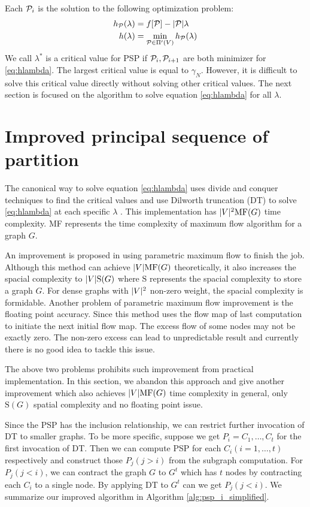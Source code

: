 \documentclass[runningheads]{llncs}
\begin{document}
Each $\P_i$ is the solution to the following optimization problem:
\begin{align}
h_{\P}(\lambda) &=  f[\P] - \abs{\P} \lambda  \label{eq:hPL}\\
h(\lambda) &= \min_{\P \in \Pi'(V)} h_{\P}(\lambda) \label{eq:hlambda}
\end{align}
We call $\lambda^*$ is a critical value for PSP if $\P_i, \P_{i+1}$ are both minimizer for \eqref{eq:hlambda}.
The largest critical value is equal to $\gamma_N$. However, it is difficult to solve this critical value directly without solving other critical values. The next section is focused on the algorithm to solve equation \eqref{eq:hlambda} for all $\lambda$.
\section{Improved principal sequence of partition}
The canonical way to solve equation \eqref{eq:hlambda} uses divide and conquer techniques to find the critical values and use Dilworth truncation (DT) to solve \eqref{eq:hlambda} at each specific $\lambda$ \cite{RN7}.  This implementation has $\abs{V}^2 \textrm{MF}(G)$ time complexity. \textrm{MF} represents the time complexity of maximum flow algorithm for a graph $G$. 

An improvement is proposed in \cite{RN4} using parametric maximum flow to finish the job. Although this method can achieve $\abs{V} \textrm{MF}(G)$ theoretically, it also increases the spacial complexity to $ \abs{V} \textrm{S}(G)$ where $\textrm{S}$ represents the spacial complexity to store a graph $G$. For dense graphs with $\abs{V}^2$ non-zero weight, the spacial complexity is formidable. 
Another problem of parametric maximum flow improvement is the floating point accuracy. Since this method uses the flow map of last computation to initiate the next initial flow map. The excess flow of some nodes may not be exactly zero. The non-zero excess can lead to unpredictable result and currently there is no good idea to tackle this issue. 

The above two problems prohibits such improvement from practical implementation. In this section, we abandon this approach and give another improvement which also achieves $\abs{V} \textrm{MF}(G)$ time complexity in general, only $\textrm{S}(G)$ spatial complexity and no floating point issue.

Since the PSP has the inclusion relationship, we can restrict further invocation of DT to smaller graphs. To be more specific, suppose we get $P_i = {C_1, \dots, C_t}$ for the first invocation of DT. Then we can compute PSP for each $C_i(i=1,\dots, t)$ respectively and construct those $P_j(j>i)$ from the subgraph computation. For $P_j(j<i)$, we can contract the graph $G$  to $G^t$ which has $t$ nodes by contracting each $C_i$ to a single node. By applying DT to $G^t$ can we get $P_j(j<i)$. We summarize our improved algorithm in Algorithm \ref{alg:psp_i_simplified}.
\end{document}
